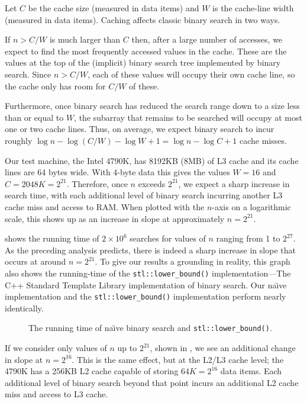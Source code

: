 \documentclass{patmorin}
\begin{document}
Let $C$ be the cache size (measured in data items) and $W$ is the
cache-line width (measured in data items).  Caching affects classic
binary search in two ways.

If $n> C/W$ is much larger than $C$ then, after a large number of
accesses, we expect to find the most frequently accessed values in the
cache.  These are the values at the top of the (implicit) binary search
tree implemented by binary search.  Since $n>C/W$, each of these values
will occupy their own cache line, so the cache only has room for $C/W$
of these.

Furthermore, once binary search has reduced the search range down to a
size less than or equal to $W$, the subarray that remains to be searched
will occupy at most one or two cache lines. Thus, on average, we expect
binary search to incur roughly $\log n -\log(C/W) - \log W + 1 = \log n -
\log C + 1$ cache misses.

Our test machine, the Intel 4790K, has 8192KB (8MB) of L3 cache and its
cache lines are 64 bytes wide.  With 4-byte data this gives the values
$W=16$ and $C=2048K=2^{21}$.
Therefore, once $n$ exceeds $2^{21}$, we expect a sharp increase in search
time, with each additional level of binary search incurring another
L3 cache miss and access to RAM.  When plotted with the $n$-axis on a
logarithmic scale, this shows up as an increase in slope at approximately
$n=2^{21}$.

 shows the running time of $2\times 10^6$ searches
for values of $n$ ranging from 1 to $2^{27}$. As the preceding analysis
predicts, there is indeed a sharp increase in slope that occurs at around
$n=2^{21}$.  To give our results a grounding in reality, this graph
also shows the running-time of the \texttt{stl::lower_bound()}
implementation---The C++ Standard Template Library implementation
of binary search.  Our na\"{\i}ve implementation and the
\texttt{stl::lower_bound()} implementation perform nearly
identically.


\begin{figure}
   \caption{The running time of na\"{\i}ve binary search and \texttt{stl::lower_bound()}.}
\end{figure}

If we consider only values of $n$ up to $2^{21}$, shown in
, we see an additional change in slope at
$n=2^{16}$.  This is the same effect, but at the L2/L3 cache level; the
4790K has a 256KB L2 cache capable of storing $64K=2^{16}$ data items.
Each additional level of binary search beyond that point incurs an
additional L2 cache miss and access to L3 cache.
\end{document}
